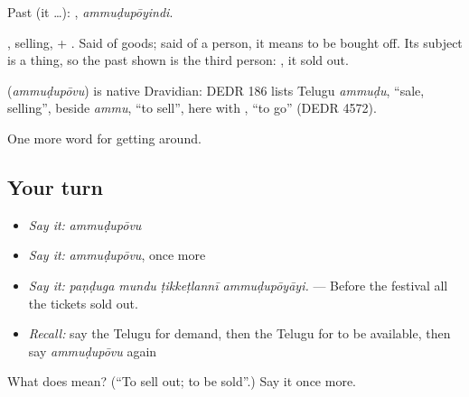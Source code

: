 Past (it …): , \emph{ammuḍupōyindi}.

, selling, + . Said of goods; said of a person, it means to be bought off. Its subject is a thing, so the past shown is the third person: , it sold out.

\begin{cousinweb}
\textbf{} (\emph{ammuḍupōvu}) is native Dravidian: DEDR 186 lists Telugu \emph{ammuḍu}, \textquotedblleft{}sale, selling\textquotedblright{}, beside \emph{ammu}, \textquotedblleft{}to sell\textquotedblright{}, here with , \textquotedblleft{}to go\textquotedblright{} (DEDR 4572).
\end{cousinweb}

\begin{grammarlens}[title={What you've built}]
One more word for getting around.
\end{grammarlens}

\subsection*{Your turn}
\begin{itemize}
\raggedright
  \item \emph{Say it:} \emph{ammuḍupōvu}
  \item \emph{Say it:} \emph{ammuḍupōvu}, once more
  \item \emph{Say it:} \emph{paṇḍuga mundu ṭikkeṭlannī ammuḍupōyāyi.} — Before the festival all the tickets sold out.
  \item \emph{Recall:} say the Telugu for demand, then the Telugu for to be available, then say \emph{ammuḍupōvu} again
\end{itemize}

\begin{tcolorbox}[breakable,colback=teal!4,colframe=teal!35!black,title={Before you move on}]
What does  mean? (\textquotedblleft{}To sell out; to be sold\textquotedblright{}.) Say it once more.
\end{tcolorbox}
